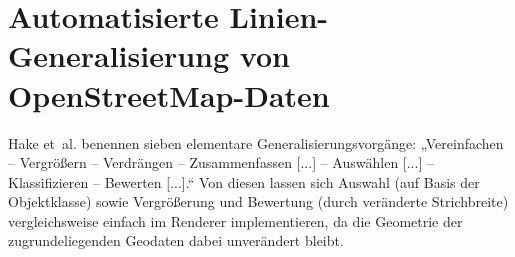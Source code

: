 \documentclass[../main/thesis.tex]{subfiles}
\begin{document}











\section{Automatisierte Linien-Generalisierung von OpenStreetMap-Daten}
\label{ch:existing-generalisation}

Hake et~al. benennen sieben elementare Generalisierungsvorgänge:
„Vereinfachen -- Vergrößern -- Verdrängen -- Zusammenfassen [...] -- Auswählen [...] -- Klassifizieren -- Bewerten [...].“ 
Von diesen lassen sich Auswahl (auf Basis der Objektklasse) sowie Vergrößerung und Bewertung (durch veränderte Strichbreite) vergleichsweise einfach im Renderer implementieren, da die Geometrie der zugrundeliegenden Geodaten dabei unverändert bleibt.
\end{document}
